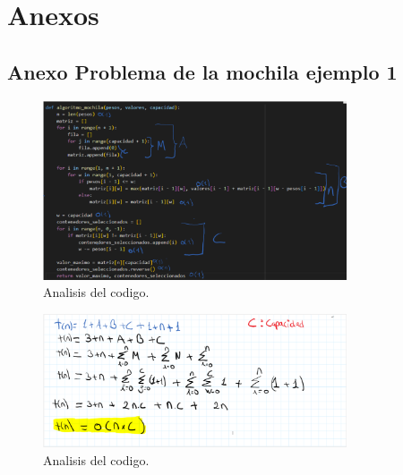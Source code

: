 \section{Anexos}
\subsection{Anexo Problema de la mochila ejemplo 1}
\begin{figure}[H]
	\centering
	\includegraphics[width=0.8\textwidth]{complejidad_mochila_ejem1.png}
	\caption{Analisis del codigo.}
	\label{fig:complejidad1}
\end{figure}

\begin{figure}[H]
	\centering
	\includegraphics[width=0.8\textwidth]{complejidad_mochila_ejem1_2.png}
	\caption{Analisis del codigo.}
	\label{fig:complejidad1}
\end{figure}


